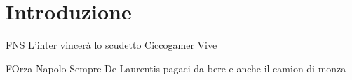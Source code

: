 \chapter*{Introduzione}
FNS
L'inter vincerà lo scudetto
Ciccogamer Vive

FOrza Napolo Sempre
De Laurentis pagaci da bere e anche il camion di monza
